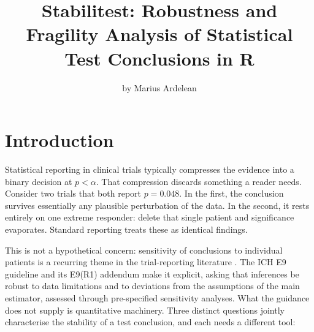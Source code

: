 \title{Stabilitest: Robustness and Fragility Analysis of Statistical Test Conclusions in R}


\author{by Marius Ardelean}

\maketitle


\section{Introduction}\label{introduction}

Statistical reporting in clinical trials typically compresses the evidence into
a binary decision at \(p < \alpha\). That compression discards something a
reader needs. Consider two trials that both report \(p = 0.048\). In the first,
the conclusion survives essentially any plausible perturbation of the data. In
the second, it rests entirely on one extreme responder: delete that single
patient and significance evaporates. Standard reporting treats these as
identical findings.

This is not a hypothetical concern: sensitivity of conclusions to individual
patients is a recurring theme in the trial-reporting literature
\citep{senn2007, pocock2015}. The ICH E9 guideline and its E9(R1) addendum
\citep{ich1998e9, ich2019e9r1} make it explicit, asking that inferences be robust
to data limitations and to deviations from the assumptions of the main
estimator, assessed through pre-specified sensitivity analyses. What the
guidance does not supply is quantitative machinery. Three distinct questions jointly characterise the
stability of a test conclusion, and each needs a different tool:

